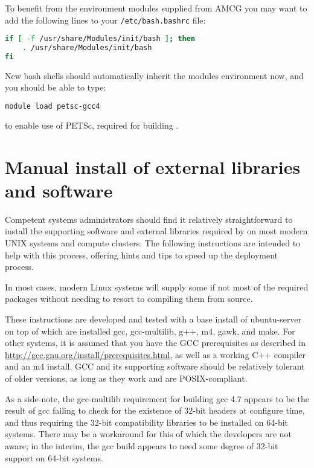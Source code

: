 To benefit from the environment modules supplied from AMCG you may want to add
the following lines to your \lstinline[language=bash]+/etc/bash.bashrc+ file:

\begin{lstlisting}[language=bash]
if [ -f /usr/share/Modules/init/bash ]; then
    . /usr/share/Modules/init/bash
fi
\end{lstlisting}

New bash shells should automatically inherit the modules environment now, and
you should be able to type:

\begin{lstlisting}[language=bash]
module load petsc-gcc4
\end{lstlisting}

to enable use of PETSc, required for building \fluidity.
 
\section{Manual install of external libraries and software}
\label{sec:required_ḻibraries_manual_install}

Competent systems administrators should find it relatively straightforward to
install the supporting software and external libraries required by \fluidity on
most modern UNIX systems and compute clusters. The following instructions are
intended to help with this process, offering hints and tips to speed up the
deployment process.

In most cases, modern Linux systems will supply some if not most of the
required packages without needing to resort to compiling them from source.

These instructions are developed and tested with a base install of
ubuntu-server on top of which are installed gcc, gcc-multilib, g++, m4, gawk,
and make. For other systems, it is assumed that you have the GCC prerequisites
as described in \url{http://gcc.gnu.org/install/prerequisites.html}, as well as
a working C++ compiler and an m4 install. GCC and its supporting software
should be relatively tolerant of older versions, as long as they work and are
POSIX-compliant.

As a side-note, the gcc-multilib requirement for building gcc 4.7 appears to be
the result of gcc failing to check for the existence of 32-bit headers at
configure time, and thus requiring the 32-bit compatibility libraries to be
installed on 64-bit systems. There may be a workaround for this of which the
\fluidity developers are not aware; in the interim, the gcc build appears to
need some degree of 32-bit support on 64-bit systems.

